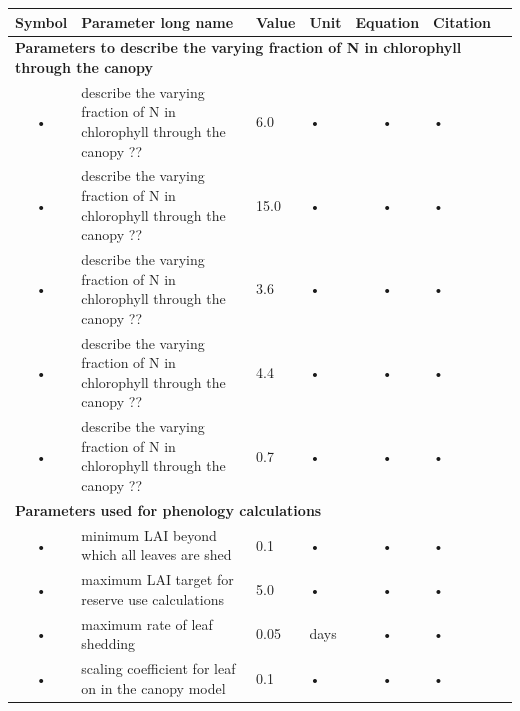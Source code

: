 \documentclass[11pt,oneside,openright,a4paper,fleqn]{book}  %
\begin{document}
\begin{table}
\begin{tabularx}{\linewidth}{|c|X|l|l|c|l|c|} %
\hline 
Symbol & Parameter long name & Value & Unit & Equation & Citation \\
\hline 

\multicolumn{6}{l}{\bf Parameters to describe the varying fraction of N in chlorophyll through the canopy}\\
\hline
• & describe the varying fraction of N in chlorophyll through the canopy ?? & 6.0 & • & • & • \\
• & describe the varying fraction of N in chlorophyll through the canopy ?? & 15.0 & • & • & • \\
• & describe the varying fraction of N in chlorophyll through the canopy ?? & 3.6 & • & • & • \\
• & describe the varying fraction of N in chlorophyll through the canopy ?? & 4.4 & • & • & • \\
• & describe the varying fraction of N in chlorophyll through the canopy ?? & 0.7 & • & • & • \\
\hline 

\multicolumn{6}{l}{\bf Parameters used for phenology calculations}\\
\hline
• & minimum LAI beyond which all leaves are shed & 0.1 & • & • & • \\
• & maximum LAI target for reserve use calculations & 5.0 & • & • & • \\
• & maximum rate of leaf shedding & 0.05 & days & • & • \\
• & scaling coefficient for leaf on in the canopy model & 0.1 & • & • & • \\

\hline 
\end{tabularx}
\end{table}
\end{document}
